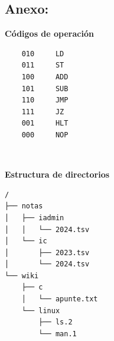 \documentclass[12pt]{article}
\begin{document}
\subsection*{ \large\textbf{Anexo:} }

\begin{minipage}{0.45\textwidth}
\textbf{Códigos de operación}

\begin{verbatim}
    010     LD
    011     ST
    100     ADD
    101     SUB
    110     JMP
    111     JZ
    001     HLT
    000     NOP
\end{verbatim}
\end{minipage}
~
\begin{minipage}{0.45\textwidth}
\textbf{Estructura de directorios}

\begin{verbatim}
/
├── notas
│   ├── iadmin
│   │   └── 2024.tsv
│   └── ic
│       ├── 2023.tsv
│       └── 2024.tsv
└── wiki
    ├── c
    │   └── apunte.txt
    └── linux
        ├── ls.2
        └── man.1
\end{verbatim}

\end{minipage}
\end{document}
